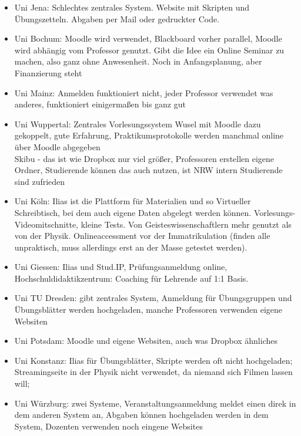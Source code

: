 \begin{itemize}
					\item Uni Jena: Schlechtes zentrales System. Website mit Skripten und Übungszetteln.
						Abgaben per Mail oder gedruckter Code. \\
					\item Uni Bochum: Moodle wird verwendet, Blackboard vorher parallel, Moodle wird abhängig vom Professor genutzt. Gibt die Idee ein Online Seminar zu machen, also ganz ohne Anwesenheit. Noch in Anfangsplanung, aber Finanzierung steht \\
					\item Uni Mainz: Anmelden funktioniert nicht, jeder Professor verwendet was anderes, funktioniert einigermaßen bis ganz gut \\
					\item Uni Wuppertal: Zentrales Vorlesungssystem Wusel mit Moodle dazu gekoppelt,
						gute Erfahrung, Praktikumsprotokolle werden manchmal online über Moodle abgegeben \\
						Skibu - das ist wie Dropbox nur viel größer, Professoren erstellen eigene Ordner, Studierende können das auch nutzen, ist NRW intern
						Studierende sind zufrieden \\
					\item Uni Köln: Ilias ist die Plattform für Materialien und so
						Virtueller Schreibtisch, bei dem auch eigene Daten abgelegt werden können. Vorlesungs-Videomitschnitte, kleine Tests. Von Geisteswissenschaftlern mehr genutzt als von der Physik.
						Onlineaccessment vor der Immatrikulation (finden alle unpraktisch, muss allerdings erst an der Masse getestet werden). \\
					\item Uni Giessen: Ilias und Stud.IP,
						Prüfungsanmeldung online, Hochschuldidaktikzentrum: Coaching für Lehrende auf 1:1 Basis. \\
					\item Uni TU Dresden: gibt zentrales System,
						Anmeldung für Übungsgruppen und Übungsblätter werden hochgeladen,
						manche Professoren verwenden eigene Websiten \\
					\item Uni Potsdam: Moodle und eigene Websiten,
						auch was Dropbox ähnliches \\
					\item Uni Konstanz: Ilias für Übungsblätter, Skripte werden oft nicht hochgeladen; Streamingseite in der Physik nicht verwendet, da niemand sich Filmen lassen will; \\
					\item Uni Würzburg: zwei Systeme, Veranstaltungsanmeldung meldet einen direk in dem anderen System an,
						Abgaben können hochgeladen werden in dem System,
						Dozenten verwenden noch eingene Websites
				\end{itemize}

